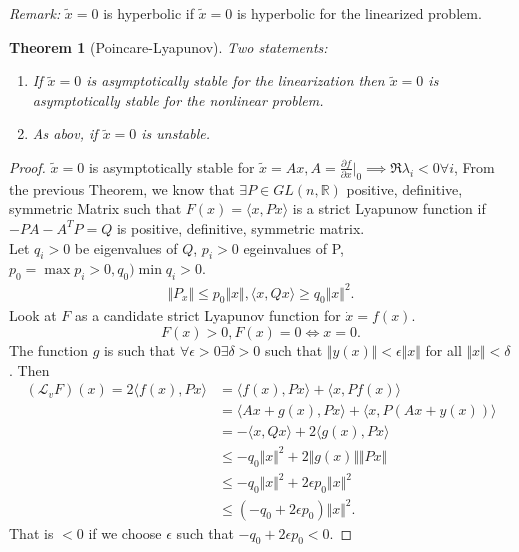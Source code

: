\documentclass{article}
\newtheorem*{theorem}{Theorem}
\theoremstyle{named}
\begin{document}
\textit{Remark:} $\tilde x = 0$ is hyperbolic if  $\tilde x = 0$ is hyperbolic for the linearized problem.

\begin{theorem}[Poincare-Lyapunov]
Two statements:
\begin{enumerate}[label=(\arabic*)]
	\item If $\tilde x = 0$ is asymptotically stable for the linearization then $\tilde x= 0$ is asymptotically stable for the nonlinear problem.
	
	\item As abov, if  $\tilde x= 0$ is unstable.
\end{enumerate}
\end{theorem}


\begin{proof} 
$\tilde x = 0$ is asymptotically stable for $\tilde x = Ax, A = \frac{\partial f}{\partial x} \Big \vert_0 \implies \Re \lambda_i < 0 \forall i$, From the previous Theorem, we know that $\exists P \in GL(n, \mathbb R)$ positive, definitive, symmetric Matrix such that $F(x) = \langle x, Px \rangle$ is a strict Lyapunow function if $-PA - A^TP = Q$ is positive, definitive, symmetric matrix. \\

Let $q_i > 0$ be eigenvalues of $Q$, $p_i > 0$ egeinvalues of P, $p_0 = \max p_i > 0, q_0 ) \min q_i > 0$.
\begin{align*}
\Vert P_x \Vert \leq p_0 \Vert x \Vert, \langle x,Qx \rangle \geq q_0 \Vert x \Vert^2.
\end{align*}
Look at $F$ as a candidate strict Lyapunov function for $\dot x = f(x)$.
\[
	F(x) > 0, F(x) = 0 \iff x = 0.
\]
The function $g$ is such that $\forall \epsilon > 0 \exists \delta > 0$ such that $\Vert y(x) \Vert < \epsilon \Vert x \Vert$ for all $\Vert x \Vert < \delta$. Then
\begin{align*}
(\mathcal L_vF)(x) = 2 \langle f(x), Px \rangle &= \langle f(x), Px \rangle + \langle x, Pf(x) \rangle \\
&= \langle Ax + g(x), Px \rangle + \langle x, P(Ax+y(x)) \rangle \\
&= - \langle x, Qx \rangle + 2 \langle g(x), Px \rangle \\
& \leq - q_0 \Vert x\Vert^2 + 2 \Vert g(x) \Vert \Vert Px \Vert \\
&\leq - q_0 \Vert x \Vert^2 + 2\epsilon p_0 \Vert x \Vert^2 \\
& \leq (-q_0 + 2 \epsilon p_0) \Vert x \Vert^2 .
\end{align*}
That is $< 0$ if we choose $\epsilon$ such that $-q_0 + 2 \epsilon p_0 < 0$.
\end{proof}
\end{document}
